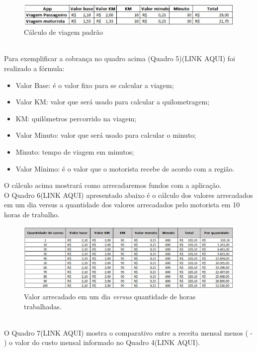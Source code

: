 \newpage
\begin{figure}
    \centering
    \includegraphics{exemplos/diagramas/Cálculo de viagem padrão.jpeg}
    \caption{Cálculo de viagem padrão}
    \label{fig:Cálculo de viagem padrão}
\end{figure}\\
Para exemplificar a cobrança no quadro acima (Quadro 5)(LINK AQUI) foi realizado a fórmula: 
\begin{itemize}
    \item Valor Base: é o valor fixo para se calcular a viagem;
    \item Valor KM: valor que será usado para calcular a quilometragem;
    \item KM: quilômetros percorrido na viagem;
    \item Valor Minuto: valor que será usado para calcular o minuto;
    \item Minuto: tempo de viagem em minutos;
    \item Valor Mínimo: é o valor que o motorista recebe de acordo com a região.
\end{itemize}
O cálculo acima mostrará como arrecadaremos fundos com a aplicação. \\
O Quadro 6(LINK AQUI) apresentado abaixo é o cálculo dos valores arrecadados em um dia versus a quantidade dos valores arrecadados pelo motorista em 10 horas de trabalho. \\
\newpage
\begin{figure}
    \centering
    \includegraphics{exemplos/diagramas/Valor arrecadado em um dia versus quantidade de horas trabalhadas.jpeg}
    \caption{Valor arrecadado em um dia \textit{versus} quantidade de horas trabalhadas.}
    \label{fig:Valor arrecadado em um dia versus quantidade de horas trabalhadas.}
\end{figure}\\
O Quadro 7(LINK AQUI) mostra o comparativo entre a receita mensal menos ( - ) o valor do custo mensal informado no Quadro 4(LINK AQUI).\\

